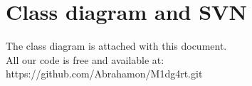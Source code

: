 \documentclass[twocolumn]{IEEEtran}
\begin{document}
\section{Class diagram and SVN}

	The class diagram is attached with this document.\\
    
    All our code is free and available at:\\ https://github.com/Abrahamon/M1dg4rt.git \\ 




\end{document}
